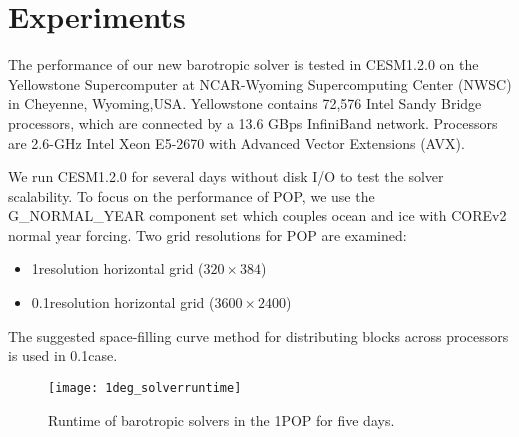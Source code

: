 \section{Experiments} \label{se:exp}

The performance of our new barotropic solver is tested in CESM1.2.0 on the Yellowstone Supercomputer at NCAR-Wyoming Supercomputing Center (NWSC) in Cheyenne, Wyoming,USA.  
Yellowstone contains 72,576 Intel Sandy Bridge processors, which are connected by a 13.6 GBps InfiniBand network. Processors are 2.6-GHz Intel Xeon E5-2670 with Advanced Vector Extensions (AVX). 

We run CESM1.2.0 for several days without disk I/O to test the solver scalability. 
To focus on the performance of POP,  we use the G\_NORMAL\_YEAR component set which couples ocean and ice with COREv2 normal year forcing.  
Two grid resolutions for POP are examined:
\begin{itemize} 
\item 1\degree resolution horizontal grid ($320\times 384$)
\item 0.1\degree resolution horizontal grid ($3600\times 2400$)
\end{itemize}
The suggested space-filling curve method for distributing blocks across processors is used in 0.1\degree case. 

\begin {figure}[!t]
\centering
\texttt{[image: 1deg\_solverruntime]}
\caption []{Runtime of barotropic solvers in the 1\degree POP for five days.\label {fig:runtime1}}
\end {figure}


